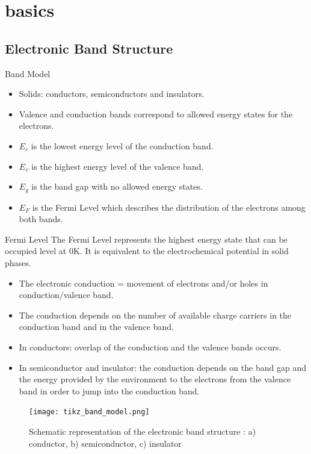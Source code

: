 \documentclass[10pt,compress]{beamer}
\begin{document}
\section{basics}
\subsection{Electronic Band Structure}
    \begin{frame}[allowframebreaks=1.0]{Band Model}
        \begin{itemize}
            \item Solids: conductors, semiconductors and insulators. 
            \item Valence and conduction bands correspond to allowed energy states for the electrons. 
            \item $E_c$ is the lowest energy level of the conduction band.
            \item $E_v$ is the highest energy level of the valence band.
            \item $E_g$ is the band gap with no allowed energy states. 
            \item $E_F$ is the Fermi Level which describes the distribution of the electrons among both bands.
        \end{itemize}
        
        \begin{alertblock}{Fermi Level}
            \footnotesize
            The Fermi Level represents the highest energy state that can be occupied level at 0K. 
            It is equivalent to the electrochemical potential in solid phases.
        \end{alertblock}
        
        \framebreak
        \begin{itemize}
            \item The electronic conduction = movement of electrons and/or holes in conduction/valence band.
            \item The conduction depends on the number of available charge carriers
            in the conduction band and in the valence band. 
            \item In conductors: overlap of the conduction and the valence bands occurs. 
            \item In semiconductor and insulator: the conduction depends on the band gap and the energy provided by 
            the environment to the electrons from the valence band in order to jump 
            into the conduction band.
        \end{itemize}

        \begin{figure}[h]
            \centering
                \texttt{[image: tikz\_band\_model.png]}
            \caption{Schematic representation of the electronic band structure \citep{marucco2006}: 
            a) conductor, b) semiconductor, c) insulator}
            \label{fig_band_model}
        \end{figure}
    \end{frame}
\end{document}
